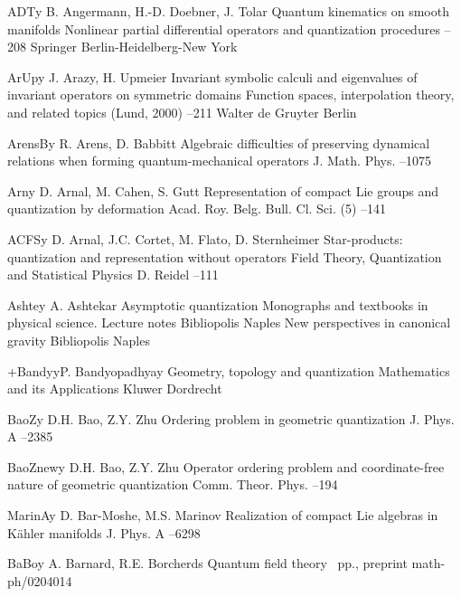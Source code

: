 \documentclass[11pt]{amsart}
\numberwithin{equation}{section}
\theoremstyle{remark}
\newcommand{\by}{\mathbf y}
\begin{document}
\begin{thebibliography}{199}
 ADT\by{ B. Angermann, H.-D. Doebner, J. Tolar \paper Quantum kinematics
on smooth manifolds \inbook Nonlinear partial differential operators and
quantization procedures --208 \publ Springer \publaddr
Berlin-Heidelberg-New York }

 ArUp\by{ J. Arazy, H. Upmeier \paper Invariant symbolic calculi and
eigenvalues of invariant operators on symmetric domains \inbook Function
spaces, interpolation theory, and related topics (Lund, 2000)  --211 \publ
Walter de Gruyter \publaddr Berlin }

 ArensB\by{ R. Arens, D. Babbitt \paper Algebraic difficulties of
preserving dynamical relations when forming quantum-mechanical operators
\jour J. Math. Phys.   --1075}

 Arn\by{ D. Arnal, M. Cahen, S. Gutt \paper Representation of compact Lie
groups and quantization by deformation \jour Acad. Roy. Belg. Bull. Cl. Sci.
(5)   --141}

 ACFS\by{ D. Arnal, J.C. Cortet, M. Flato, D. Sternheimer \paper
Star-products: quantization and representation without operators \inbook Field
Theory, Quantization and Statistical Physics \publ D. Reidel  --111}

 Ashte\by{ A. Ashtekar \book Asymptotic quantization \bookinfo Monographs
and textbooks in physical science. Lecture notes  \publ Bibliopolis
\publaddr Naples  \moreref \book New perspectives in canonical gravity
\publ Bibliopolis \publaddr Naples }

 +Bandy\by{P. Bandyopadhyay \book Geometry, topology and quantization
\bookinfo Mathematics and its Applications  \publ Kluwer \publaddr
Dordrecht }

 BaoZ\by{ D.H. Bao, Z.Y. Zhu \paper Ordering problem in geometric
quantization \jour J. Phys. A   --2385}

 BaoZnew\by{ D.H. Bao, Z.Y. Zhu \paper Operator ordering problem and
coordinate-free nature of geometric quantization \jour Comm. Theor. Phys.
  --194}

 MarinA\by{ D. Bar-Moshe, M.S. Marinov \paper Realization of compact Lie
algebras in K\"ahler manifolds \jour J. Phys. A   --6298}

 BaBo\by{ A. Barnard, R.E. Borcherds \paper Quantum field theory
~pp., preprint math-ph/0204014}


\end{thebibliography}
\end{document}
